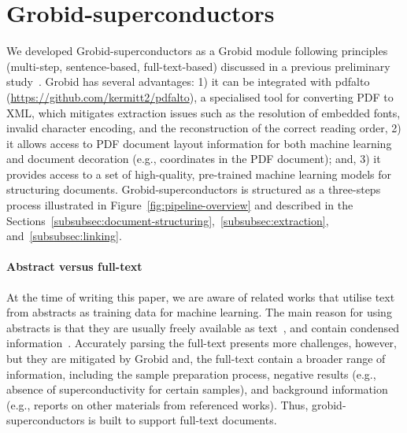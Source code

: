 \documentclass[]{interact}
\theoremstyle{plain}%
\theoremstyle{definition}
\theoremstyle{remark}
\begin{document}
\section{Grobid-superconductors}

We developed Grobid-superconductors as a Grobid module following principles (multi-step, sentence-based, full-text-based) discussed in a previous preliminary study~\cite{foppiano:hal-02870896}.
Grobid has several advantages: 1) it can be integrated with pdfalto (\url{https://github.com/kermitt2/pdfalto}), a specialised tool for converting PDF to XML, which mitigates extraction issues such as the resolution of embedded fonts, invalid character encoding, and the reconstruction of the correct reading order, 2) it allows access to PDF document layout information for both machine learning and document decoration (e.g., coordinates in the PDF document); and, 3) it provides access to a set of high-quality, pre-trained machine learning models for structuring documents.
Grobid-superconductors is structured as a three-steps process illustrated in Figure~\ref{fig:pipeline-overview} and described in the Sections~\ref{subsubsec:document-structuring},~\ref{subsubsec:extraction}, and~\ref{subsubsec:linking}.

\paragraph*{Abstract versus full-text}
At the time of writing this paper, we are aware of related works that utilise text from abstracts as training data for machine learning.
The main reason for using abstracts is that they are usually freely available as text~\cite{kononova_text-mined_2019}, and contain condensed information~\cite{yamaguchi-etal-2020-sc, court_magnetic_2020}.
Accurately parsing the full-text presents more challenges, however, but they are mitigated by Grobid and, the full-text contain a broader range of information, including the sample preparation process, negative results (e.g., absence of superconductivity for certain samples), and background information (e.g., reports on other materials from referenced works).
Thus, grobid-superconductors is built to support full-text documents.

\end{document}
